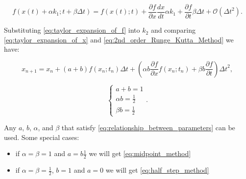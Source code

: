 \documentclass[11pt]{article}
\providecommand{\tightlist}{%
      \setlength{\itemsep}{0pt}\setlength{\parskip}{0pt}}
\begin{document}
\begin{equation}\label{eq:taylor_expansion_of_f}
    f(x(t) + \alpha k_1; t + \beta\Delta t) = f(x(t);t) + \frac{\partial f}{\partial x}\frac{dx}{dt}\alpha k_1  + \frac{\partial f}{\partial t}\beta\Delta t + \mathscr{O}({\Delta t}^2).
\end{equation}

Substituting \ref{eq:taylor_expansion_of_f} into \(k_2\) and comparing
\ref{eq:taylor_expansion_of_x} and \ref{eq:2nd_order_Runge_Kutta_Method}
we have:

\begin{equation}
    x_{n+1} = x_n + (a + b)f(x_n;t_n)\Delta t + (\alpha b \frac{\partial f}{\partial x}f(x_n;t_n) + \beta b \frac{\partial f}{\partial t}){\Delta t}^2,
\end{equation}

\begin{equation}\label{eq:relationship_between_parameters}
    \left\{
    \begin{array}{l}
        a + b = 1\\
        \alpha b = \frac{1}{2} \\
        \beta b = \frac{1}{2}
    \end{array}
    \right..
\end{equation}

Any \(a\), \(b\), \(\alpha\), and \(\beta\) that satisfy
\ref{eq:relationship_between_parameters} can be used. Some special
cases:

\begin{itemize}
\tightlist
\item
  if \(\alpha=\beta=1\) and \(a=b\frac{1}{2}\) we will get
  \ref{eq:midpoint_method}
\item
  if \(\alpha=\beta=\frac{1}{2}\), \(b=1\) and \(a=0\) we will get
  \ref{eq:half_step_method}
\end{itemize}


    
    
    
\end{document}
